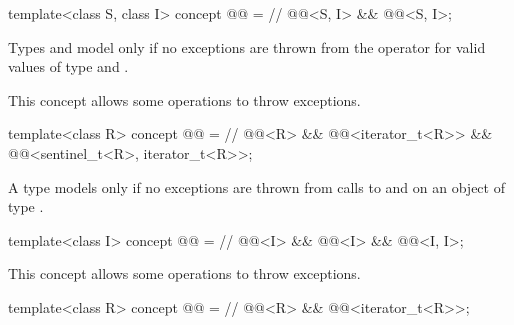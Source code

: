 \begin{itemdecl}
template<class S, class I>
concept @@ = // \expos
  @@<S, I> &&
  @@<S, I>;
\end{itemdecl}

\begin{itemdescr}
\pnum
Types  and  model 
only if no exceptions are thrown from the \tcode{-} operator
for valid values of type  and .

\pnum
\begin{note}
This concept allows some 
operations to throw exceptions.
\end{note}
\end{itemdescr}

\begin{itemdecl}
template<class R>
concept @@ = // \expos
  @@<R> &&
  @@<iterator_t<R>> &&
  @@<sentinel_t<R>, iterator_t<R>>;
\end{itemdecl}

\begin{itemdescr}
\pnum
A type  models  only if
no exceptions are thrown from calls to  and
 on an object of type .
\end{itemdescr}

\begin{itemdecl}
template<class I>
concept @@ = // \expos
  @@<I> &&
  @@<I> &&
  @@<I, I>;
\end{itemdecl}

\begin{itemdescr}
\pnum
\begin{note}
This concept allows some 
operations to throw exceptions.
\end{note}
\end{itemdescr}

\begin{itemdecl}
template<class R>
concept @@ = // \expos
  @@<R> &&
  @@<iterator_t<R>>;
\end{itemdecl}

